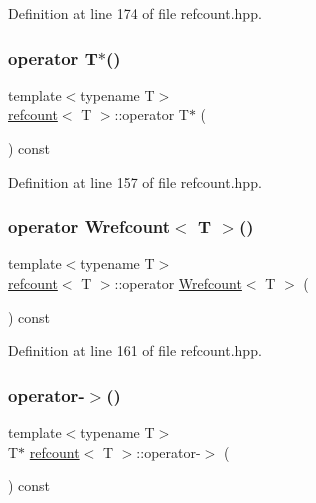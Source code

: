 Definition at line 174 of file refcount.\+hpp.

\mbox{\label{structrefcount_a36c77f8281dff34ee3979edabee0d833}} 
\subsubsection{\texorpdfstring{operator T$\ast$()}{operator T*()}}
{\footnotesize\ttfamily template$<$typename T$>$ \\
\hyperlink{structrefcount}{refcount}$<$ T $>$\+::operator T$\ast$ (\begin{DoxyParamCaption}{ }\end{DoxyParamCaption}) const\hspace{0.3cm}{\ttfamily [inline]}}



Definition at line 157 of file refcount.\+hpp.

\mbox{\label{structrefcount_ab531dc0fba2a14b8cd9b7dd368d3a300}} 
\subsubsection{\texorpdfstring{operator Wrefcount$<$ T $>$()}{operator Wrefcount< T >()}}
{\footnotesize\ttfamily template$<$typename T$>$ \\
\hyperlink{structrefcount}{refcount}$<$ T $>$\+::operator \hyperlink{classWrefcount}{Wrefcount}$<$ T $>$ (\begin{DoxyParamCaption}{ }\end{DoxyParamCaption}) const\hspace{0.3cm}{\ttfamily [inline]}}



Definition at line 161 of file refcount.\+hpp.

\mbox{\label{structrefcount_a84d960db3d3cd42e50255bc7acf52676}} 
\subsubsection{\texorpdfstring{operator-\/$>$()}{operator->()}}
{\footnotesize\ttfamily template$<$typename T$>$ \\
T$\ast$ \hyperlink{structrefcount}{refcount}$<$ T $>$\+::operator-\/$>$ (\begin{DoxyParamCaption}{ }\end{DoxyParamCaption}) const\hspace{0.3cm}{\ttfamily [inline]}}



